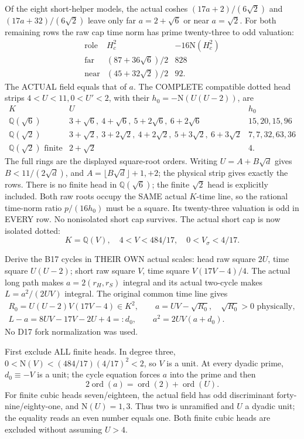 Of the eight short-helper models, the actual
coshes
\((17a+2)/(6\sqrt2)\) and
\((17a+32)/(6\sqrt2)\)
leave only far \(a=2+\sqrt6\) or near
\(a=\sqrt2\).
For both remaining rows the raw cap time norm
has prime twenty-three to odd valuation:
\[
\begin{array}{c|c|c}
 \text{role}&H_c^2&-16\mathrm N(H_c^2)\\ \hline
 \text{far}&(87+36\sqrt6)/2&828\\
 \text{near}&(45+32\sqrt2)/2&92 .
\end{array}
\]
The ACTUAL field equals that of \(a\).
The COMPLETE compatible dotted head strips
\(4<U<11,0<U'<2\), with their
\(h_0=-\mathrm N(U(U-2))\), are
\[
\begin{array}{c|l|l}
 K&U&h_0\\ \hline
 \mathbb Q(\sqrt6)&
 3+\sqrt6,\ 4+\sqrt6,\ 5+2\sqrt6,\ 6+2\sqrt6&
 15,20,15,96\\
 \mathbb Q(\sqrt2)&
 3+\sqrt2,\ 3+2\sqrt2,\ 4+2\sqrt2,\ 5+3\sqrt2,\ 6+3\sqrt2&
 7,7,32,63,36\\
 \mathbb Q(\sqrt2)\text{ finite}&2+\sqrt2&4 .
\end{array}
\]
The full rings are the displayed square-root
orders.
Writing \(U=A+B\sqrt d\) gives
\(B<11/(2\sqrt d)\), and
\(A=\lfloor B\sqrt d\rfloor+1,+2\);
the physical strip gives exactly the rows.
There is no finite head in \(\mathbb Q(\sqrt6)\);
the finite \(\sqrt2\) head is explicitly included.
Both raw roots occupy the SAME actual \(K\)-time
line, so the rational time-norm ratio
\(p/(16h_0)\) must be a square.
Its twenty-three valuation is odd in EVERY row.
No nonisolated short cap survives.
The actual short cap is now isolated dotted:
\[
                 K=\mathbb Q(V),\quad
                 4<V<484/17,\quad0<V_\sigma<4/17 .
\]

Derive the B17 cycles in THEIR OWN actual scales:
head raw square \(2U\), time square \(U(U-2)\);
short raw square \(V\), time square \(V(17V-4)/4\).
The actual long path makes
\(a=2(r_H,r_S)\) integral and its actual
two-cycle makes \(L=a^2/(2UV)\) integral.
The original common time line gives
\[
 \begin{gathered}
 R_0=U(U-2)V(17V-4)\in K^2,\qquad
 a=UV-\sqrt{R_0},\quad\sqrt{R_0}>0\text{ physically},\\
 L-a=8UV-17V-2U+4=:d_0,\qquad
 a^2=2UV(a+d_0).
 \end{gathered}
\tag{B17C}\label{eq:arithB17cycles}
\]
No D17 fork normalization was used.

First exclude ALL finite heads.
In degree three,
\(0<\mathrm N(V)<(484/17)(4/17)^2<2\),
so \(V\) is a unit.
At every dyadic prime, \(d_0\equiv-V\) is a unit;
the cycle equation forces \(a\) into the prime
and then
\[
                     2\operatorname{ord}(a)
                      =\operatorname{ord}(2)+\operatorname{ord}(U).
\]
For finite cubic heads seven/eighteen,
the actual field has odd discriminant
forty-nine/eighty-one, and \(\mathrm N(U)=1,3\).
Thus two is unramified and \(U\) a dyadic unit;
the equality reads an even number equals one.
Both finite cubic heads are excluded without
assuming \(U>4\).

